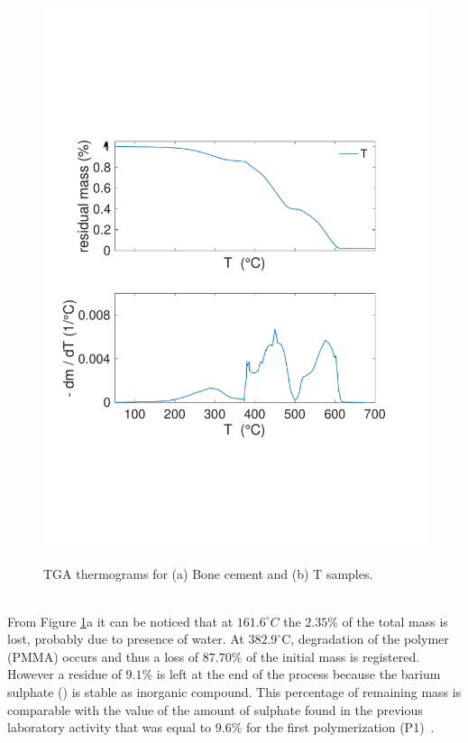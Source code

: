 \documentclass[a4paper, 11pt]{article}
\begin{document}
\begin{figure}[htp]
{\includegraphics[scale=0.42]{tgaT}} \quad 
\captionsetup{justification=centering}
\caption{TGA thermograms for (a) Bone cement and (b) T samples.}
\label{fig:tga}
\end{figure}\\
From Figure \ref{fig:tga}a it can be noticed that at $161.6^\circ C $ the $2.35 \%$ of the total mass is lost, probably due to presence of water. At $382.9^\circ$C, degradation of the polymer (PMMA) occurs and thus a loss of $87.70\%$ of the initial mass is registered. However a residue of $9.1\%$ is left at the end of the process because the barium sulphate () is stable as inorganic compound. This percentage of remaining mass is comparable with the value of the amount of sulphate found in the previous laboratory activity that was equal to $9.6\%$ for the first polymerization (P1)~\cite{gruppo1}. 
\end{document}

